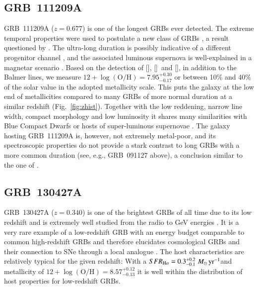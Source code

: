 \documentclass[traditabstract, longauth]{aa}
\newcommand{\oh}{12+\log(\mathrm{O/H})}
\newcommand{\oii}{[\ion{O}{ii}]}
\newcommand{\oiii}{[\ion{O}{iii}]}
\newcommand{\neiii}{[\ion{Ne}{iii}]}
\newcommand{\Msunyr}{$M_\odot\,\rm{yr}^{-1}$}
\begin{document}
\begin{appendix}
\subsection{GRB~111209A} GRB~111209A ($z=0.677$) is one of the longest GRBs ever detected. The extreme temporal properties were used to postulate a new class of GRBs \citep{2013ApJ...766...30G, 2014ApJ...781...13L}, a result questioned by \citet{2013ApJ...778...54V}. The ultra-long duration is possibly indicative of a different progenitor channel \citep{2013ApJ...778...67N}, and the associated luminous supernova is well-explained in a magnetar scenario \citep{2015Kannsubm, 2015Greinersubm}. Based on the detection of \oii, \oiii\, and \neiii, in addition to the Balmer lines, we measure $\oh=7.95_{-0.17}^{+0.30}$ or between 10\% and 40\% of the solar value in the adopted metallicity scale. This puts the galaxy at the low end of metallicities compared to many GRBs of more normal duration at a similar redshift (Fig.~\ref{fig:zhist}). Together with the low reddening, narrow line width, compact morphology and low luminosity \citep{2014ApJ...781...13L} it shares many similarities with Blue Compact Dwarfs \citep[e.g.,][and references therein]{2003ApJS..147...29G} or hosts of super-luminous supernovae \citep[e.g.,][]{2014arXiv1409.8331L}. The galaxy hosting GRB~111209A is, however, not extremely metal-poor, and its spectroscopic properties do not provide a stark contrast to long GRBs with a more common duration (see, e.g., GRB~091127 above), a conclusion similar to the one of \citet{2014ApJ...781...13L}.

\subsection{GRB~130427A} GRB~130427A ($z=0.340$) is one of the brightest GRBs of all time due to its low redshift and is extremely well studied from the radio to GeV energies \citep[e.g.,][]{2014ApJ...781...37P, 2014Sci...343...42A, 2014MNRAS.444.3151V}. It is a very rare example of a low-redshift GRB with an energy budget comparable to common high-redshift GRBs and therefore elucidates cosmological GRBs and their connection to SNe through a local analogue \citep{2013ApJ...776...98X, 2014ApJ...792..115L, 2014A&A...567A..29M}. The host characteristics are relatively typical for the given redshift: With a $SFR_{\rm{H\alpha}}= 0.3^{+0.2}_{-0.1}\,$\Msunyr and metallicity of $\oh=8.57_{-0.13}^{+0.12}$ it is well within the distribution of host properties for low-redshift GRBs.

\end{appendix}
\end{document}
